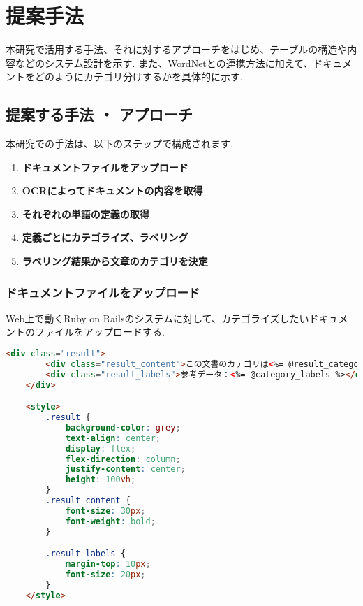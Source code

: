 \chapter{提案手法}
\label{ch:app}
\quad

本研究で活用する手法、それに対するアプローチをはじめ、テーブルの構造や内容などのシステム設計を示す.
また、WordNetとの連携方法に加えて、ドキュメントをどのようにカテゴリ分けするかを具体的に示す.

\section{提案する手法 ・ アプローチ}
\label{sec:app_method}

本研究での手法は、以下のステップで構成されます.
\begin{enumerate}
    \item \textbf{ドキュメントファイルをアップロード}
    \item \textbf{OCRによってドキュメントの内容を取得}
    \item \textbf{それぞれの単語の定義の取得}
    \item \textbf{定義ごとにカテゴライズ、ラベリング}
    \item \textbf{ラベリング結果から文章のカテゴリを決定}
\end{enumerate}

\subsection{ドキュメントファイルをアップロード}
\label{subsec:app_upload}

Web上で動くRuby on Railsのシステムに対して、カテゴライズしたいドキュメントのファイルをアップロードする.
\clearpage
\begin{lstlisting}[language=HTML, caption=フロントエンドの ERB]
    <div class="result">
        <div class="result_content">この文書のカテゴリは<%= @result_category %>です</div>
        <div class="result_labels">参考データ：<%= @category_labels %></div>
    </div>

    <style>
        .result {
            background-color: grey;
            text-align: center;
            display: flex;
            flex-direction: column;
            justify-content: center;
            height: 100vh;
        }
        .result_content {
            font-size: 30px;
            font-weight: bold;
        }

        .result_labels {
            margin-top: 10px;
            font-size: 20px;
        }
    </style>
\end{lstlisting}

